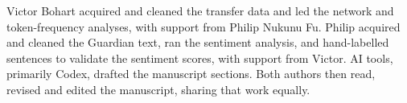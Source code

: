 Victor Bohart acquired and cleaned the transfer data and led the network and token-frequency analyses, with support from Philip Nukunu Fu. Philip acquired and cleaned the Guardian text, ran the sentiment analysis, and hand-labelled sentences to validate the sentiment scores, with support from Victor. AI tools, primarily Codex, drafted the manuscript sections. Both authors then read, revised and edited the manuscript, sharing that work equally.
